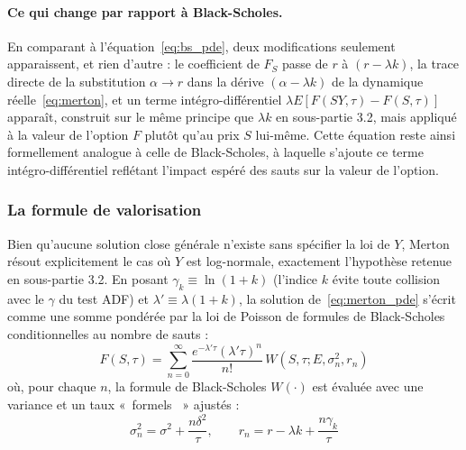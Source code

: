 \documentclass{article}
\providecommand{\og}{«~}
\providecommand{\fg}{~»}
\begin{document}
\paragraph{Ce qui change par rapport à Black-Scholes.} En comparant à l'équation~\eqref{eq:bs_pde}, deux modifications seulement apparaissent, et rien d'autre : le coefficient de $F_S$ passe de $r$ à $(r-\lambda k)$, la trace directe de la substitution $\alpha \to r$ dans la dérive $(\alpha-\lambda k)$ de la dynamique réelle~\eqref{eq:merton}, et un terme intégro-différentiel $\lambda E[F(SY,\tau)-F(S,\tau)]$ apparaît, construit sur le même principe que $\lambda k$ en sous-partie 3.2, mais appliqué à la valeur de l'option $F$ plutôt qu'au prix $S$ lui-même. Cette équation reste ainsi formellement analogue à celle de Black-Scholes, à laquelle s'ajoute ce terme intégro-différentiel reflétant l'impact espéré des sauts sur la valeur de l'option.
\subsubsection*{La formule de valorisation}
Bien qu'aucune solution close générale n'existe sans spécifier la loi de $Y$, Merton résout explicitement le cas où $Y$ est log-normale, exactement l'hypothèse retenue en sous-partie 3.2. En posant $\gamma_k \equiv \ln(1+k)$ (l'indice $k$ évite toute collision avec le $\gamma$ du test ADF) et $\lambda' \equiv \lambda(1+k)$, la solution de~\eqref{eq:merton_pde} s'écrit comme une somme pondérée par la loi de Poisson de formules de Black-Scholes conditionnelles au nombre de sauts :
\begin{equation}
F(S,\tau) = \sum_{n=0}^{\infty} \frac{e^{-\lambda'\tau}(\lambda'\tau)^n}{n!}\, W(S,\tau;E,\sigma_n^2,r_n)
\end{equation}
où, pour chaque $n$, la formule de Black-Scholes $W(\cdot)$ est évaluée avec une variance et un taux \og formels \fg{} ajustés :
\begin{equation}
\sigma_n^2 = \sigma^2 + \frac{n\delta^2}{\tau}, \qquad r_n = r - \lambda k + \frac{n\gamma_{k}}{\tau}
\end{equation}
\end{document}
